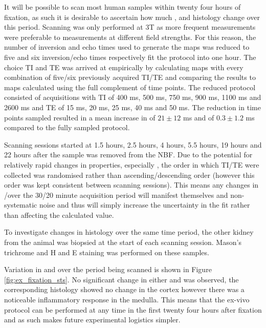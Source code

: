 It will be possible to scan most human samples within twenty four hours of fixation, as such it is desirable to ascertain how much \tone, \ttwostar and histology change over this period. Scanning was only performed at 3T as more frequent measurements were preferable to measurements at different field strengths. For this reason, the number of inversion and echo times used to generate the maps was reduced to five and six inversion/echo times respectively fit the protocol into one hour. The choice \ac{TI} and \ac{TE} was arrived at empirically by calculating maps with every combination of five/six previously acquired \ac{TI}/\ac{TE} and comparing the results to maps calculated using the full complement of time points. The reduced protocol consisted of acquisitions with \ac{TI} of 400 ms, 500 ms, 750 ms, 900 ms, 1100 ms and 2600 ms and \ac{TE} of 15 ms, 20 ms, 25 ms, 40 ms and 50 ms. The reduction in time points sampled resulted in a mean increase in \tone of $21 \pm 12$ ms and \ttwostar of $0.3 \pm 1.2$ ms compared to the fully sampled protocol.

Scanning sessions started at 1.5 hours, 2.5 hours, 4 hours, 5.5 hours, 19 hours and 22 hours after the sample was removed from the \ac{NBF}. Due to the potential for relatively rapid changes in properties, especially \tone, the order in which \ac{TI}/\ac{TE} were collected was randomised rather than ascending/descending order (however this order was kept consistent between scanning sessions). This means any changes in \tone/\ttwostar over the 30/20 minute acquisition period will manifest themselves and non-systematic noise and thus will simply increase the uncertainty in the fit rather than affecting the calculated value.

To investigate changes in histology over the same time period, the other kidney from the animal was biopsied at the start of each scanning session. Mason's trichrome and \ac{H and E} staining was performed on these samples.

Variation in \tone and \ttwostar over the period being scanned is shown in Figure \ref{fig:ex_fixation_sts}. No significant change in either \tone and \ttwostar was observed, the corresponding histology showed no change in the cortex however there was a noticeable inflammatory response in the medulla. This means that the ex-vivo protocol can be performed at any time in the first twenty four hours after fixation and as such makes future experimental logistics simpler.

